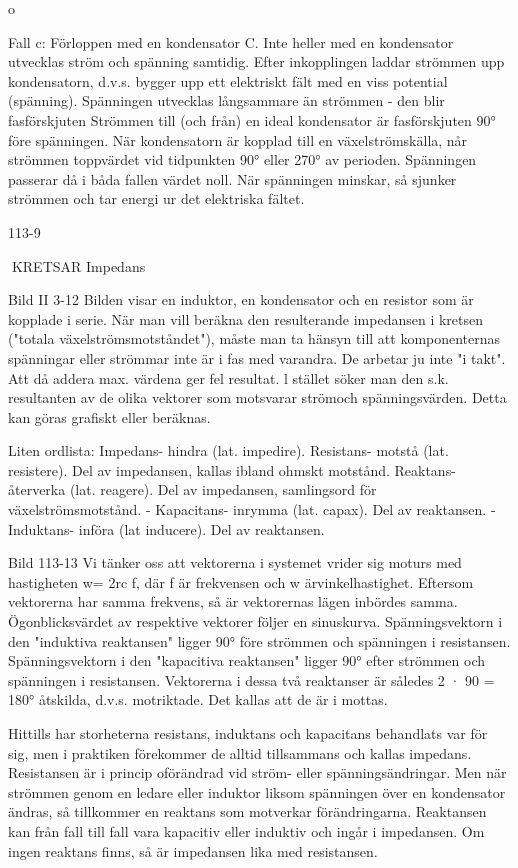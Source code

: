 {o

Fall c: Förloppen med en kondensator C.
Inte heller med en kondensator utvecklas
ström och spänning samtidig. Efter inkopplingen laddar strömmen upp kondensatorn,
d.v.s. bygger upp ett elektriskt fält med en
viss potential (spänning). Spänningen utvecklas långsammare än strömmen - den
blir fasförskjuten
Strömmen till (och från) en ideal kondensator är fasförskjuten 90° före spänningen.
När kondensatorn är kopplad till en växelströmskälla, når strömmen toppvärdet vid
tidpunkten 90° eller 270° av perioden. Spänningen passerar då i båda fallen värdet noll.
När spänningen minskar, så sjunker strömmen och tar energi ur det elektriska fältet.

113-9

KRETSAR
Impedans

Bild II 3-12
Bilden visar en induktor, en kondensator
och en resistor som är kopplade i serie. När
man vill beräkna den resulterande impedansen i kretsen ("totala växelströmsmotståndet"), måste man ta hänsyn till att komponenternas spänningar eller strömmar inte är
i fas med varandra. De arbetar ju inte "i takt".
Att då addera max. värdena ger fel resultat. l stället söker man den s.k. resultanten
av de olika vektorer som motsvarar strömoch spänningsvärden.
Detta kan göras grafiskt eller beräknas.

Liten ordlista:
Impedans- hindra
(lat. impedire).
Resistans- motstå
(lat. resistere).
Del av impedansen,
kallas ibland ohmskt motstånd.
Reaktans- återverka
(lat. reagere).
Del av impedansen,
samlingsord för växelströmsmotstånd.
- Kapacitans- inrymma (lat. capax).
Del av reaktansen.
- Induktans- införa
(lat inducere).
Del av reaktansen.

Bild 113-13
Vi tänker oss att vektorerna i systemet
vrider sig moturs med hastigheten w= 2rc f,
där f är frekvensen och w ärvinkelhastighet.
Eftersom vektorerna har samma frekvens,
så är vektorernas lägen inbördes samma.
Ögonblicksvärdet av respektive vektorer följer en sinuskurva.
Spänningsvektorn i den "induktiva reaktansen" ligger 90° före strömmen och spänningen i resistansen. Spänningsvektorn i
den "kapacitiva reaktansen" ligger 90° efter
strömmen och spänningen i resistansen.
Vektorerna i dessa två reaktanser är således 2 · 90 = 180° åtskilda, d.v.s. motriktade.
Det kallas att de är i mottas.

Hittills har storheterna resistans, induktans
och kapacitans behandlats var för sig, men
i praktiken förekommer de alltid tillsammans
och kallas impedans.
Resistansen är i princip oförändrad vid
ström- eller spänningsändringar. Men när
strömmen genom en ledare eller induktor
liksom spänningen över en kondensator ändras, så tillkommer en reaktans som motverkar förändringarna.
Reaktansen kan från fall till fall vara kapacitiv eller induktiv och ingår i impedansen.
Om ingen reaktans finns, så är impedansen
lika med resistansen.

}
